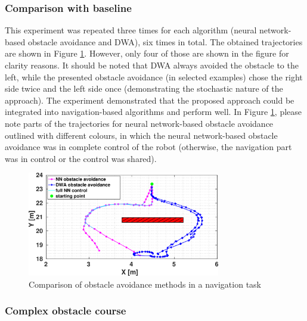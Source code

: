 \subsubsection{Comparison with baseline}

This experiment was repeated three times for each algorithm (neural network-based obstacle avoidance and DWA), six times in total. The obtained trajectories are shown in Figure \ref{fig:Fig11}. However, only four of those are shown in the figure for clarity reasons. It should be noted that DWA always avoided the obstacle to the left, while the presented obstacle avoidance (in selected examples) chose the right side twice and the left side once (demonstrating the stochastic nature of the approach). The experiment demonstrated that the proposed approach could be integrated into navigation-based algorithms and perform well. In Figure \ref{fig:Fig11}, please note parts of the trajectories for neural network-based obstacle avoidance outlined with different colours, in which the neural network-based obstacle avoidance was in complete control of the robot (otherwise, the navigation part was in control or the control was shared).

\begin{figure}
    \centering
    \includegraphics[width=0.75\textwidth]{slike/Fig04_08.png}
    \caption{Comparison of obstacle avoidance methods in a navigation task}
    \label{fig:Fig11}
\end{figure}

\subsubsection{Complex obstacle course}

